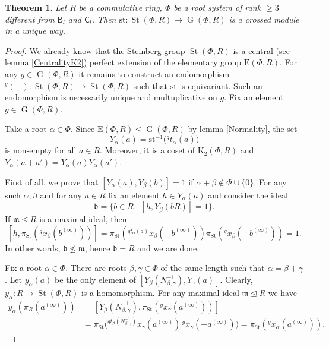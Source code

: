 \documentclass{article}
\numberwithin{equation}{section}
\newtheorem{theorem}{Theorem}
\theoremstyle{definition}
\theoremstyle{remark}
\DeclareMathOperator\St{St}
\DeclareMathOperator\GG{G}
\newcommand{\up}[2]{{^{#1}\!{#2}}}
\newcommand{\rB}{\mathsf{B}}
\newcommand{\rC}{\mathsf{C}}
\begin{document}
\begin{theorem}\label{SteinbergCrossedModule}
 Let \(R\) be a commutative ring, \(\Phi\) be a root system of rank \(\geq 3\) different from \(\rB_l\) and \(\rC_l\). Then \(\mathrm{st} \colon \St(\Phi, R) \to \GG(\Phi, R)\) is a crossed module in a unique way.
\end{theorem}
\begin{proof}
 We already know that the Steinberg group \(\St(\Phi, R)\) is a central (see lemma \ref{CentralityK2}) perfect extension of the elementary group \(\mathrm E(\Phi, R)\). For any \(g \in \GG(\Phi, R)\) it remains to construct an endomorphism \(\up g{(-)} \colon \St(\Phi, R) \to \St(\Phi, R)\) such that \(\mathrm{st}\) is equivariant. Such an endomorphism is necessarily unique and multuplicative on \(g\). Fix an element \(g \in \GG(\Phi, R)\).

 Take a root \(\alpha \in \Phi\). Since \(\mathrm E(\Phi, R) \trianglelefteq \GG(\Phi, R)\) by lemma \ref{Normality}, the set
 \[Y_\alpha(a) = \mathrm{st}^{-1}\bigl(\up g{t_\alpha(a)}\bigr)\]
 is non-empty for all \(a \in R\). Moreover, it is a coset of \(\mathrm K_2(\Phi, R)\) and \(Y_\alpha(a + a') = Y_\alpha(a) Y_\alpha(a')\).

 First of all, we prove that \([Y_\alpha(a), Y_\beta(b)] = 1\) if \(\alpha + \beta \notin \Phi \cup \{0\}\). For any such \(\alpha, \beta\) and for any \(a \in R\) fix an element \(h \in Y_\alpha(a)\) and consider the ideal
 \[\mathfrak b = \{b \in R \mid [h, Y_\beta(bR)] = 1\}.\]
 If \(\mathfrak m \trianglelefteq R\) is a maximal ideal, then
 \[[h, \pi_{\St}(\up g {x_\beta(b^{(\infty)})})] = \pi_{\St}(\up{g t_\alpha(a)} {x_\beta(-b^{(\infty)})}) \pi_{\St}(\up g {x_\beta(-b^{(\infty)})}) = 1.\]
 In other words, \(\mathfrak b \not \leq \mathfrak m\), hence \(\mathfrak b = R\) and we are done.

 Fix a root \(\alpha \in \Phi\). There are roots \(\beta, \gamma \in \Phi\) of the same length such that \(\alpha = \beta + \gamma\). Let \(y_\alpha(a)\) be the only element of \([Y_\beta(N_{\beta, \gamma}^{-1}), Y_\gamma(a)]\). Clearly, \(y_\alpha \colon R \to \St(\Phi, R)\) is a homomorphism. For any maximal ideal \(\mathfrak m \trianglelefteq R\) we have
 \begin{align*}
  y_\alpha(\pi_R(a^{(\infty)}))
  &= [Y_\beta(N_{\beta, \gamma}^{-1}), \pi_{\St}(\up g{x_\gamma(a^{(\infty)})})] =\\
  &= \pi_{\St}\bigl(\up{g t_\beta(N_{\beta, \gamma}^{-1})}{x_\gamma(a^{(\infty)})}\, \up g{x_\gamma(-a^{(\infty)})}\bigr) = \pi_{\St}(\up g{x_\alpha(a^{(\infty)})}).
 \end{align*}


\end{proof}
\end{document}
